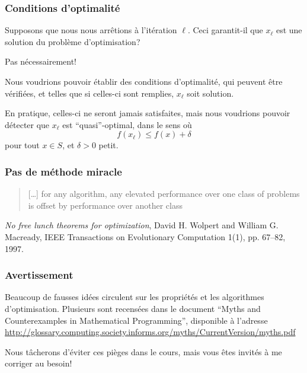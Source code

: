 \documentclass[usepdftitle=false]{beamer}
\def\red{\color{red}}
\begin{document}
\begin{frame}
\frametitle{Conditions d'optimalité}

Supposons que nous nous arrêtions à l'itération $\ell$.
Ceci garantit-il que $x_{\ell}$ est une solution du problème d'optimisation?

\mbox{}

Pas nécessairement!

\mbox{}

Nous voudrions pouvoir établir des {\red conditions d'optimalité}, qui peuvent être vérifiées, et telles que si celles-ci sont remplies, $x_{\ell}$ soit solution.

\mbox{}

En pratique, celles-ci ne seront jamais satisfaites, mais nous voudrions pouvoir détecter que $x_{\ell}$ est ``quasi''-optimal, dans le sens où
\[
f(x_{\ell}) \leq f(x)+\delta
\]
pour tout $x \in S$, et $\delta > 0$ petit.

\end{frame}

\begin{frame}
\frametitle{Pas de méthode miracle}

\begin{quote}
[\ldots] for any algorithm, any elevated performance over one class of problems is offset by performance over another class
\end{quote}
{\sl No free lunch theorems for optimization}, David H. Wolpert and William G. Macready, IEEE Transactions on Evolutionary Computation 1(1), pp. 67--82, 1997.

\end{frame}

\begin{frame}
\frametitle{Avertissement}

Beaucoup de fausses idées circulent sur les propriétés et les algorithmes d'optimisation.
Plusieurs sont recensées dans le document ``Myths and Counterexamples in Mathematical Programming'', disponible à l'adresse
\url{http://glossary.computing.society.informs.org/myths/CurrentVersion/myths.pdf}

\mbox{}

Nous tâcherons d'éviter ces pièges dans le cours, mais vous êtes invités à me corriger au besoin!

\end{frame}
\end{document}
